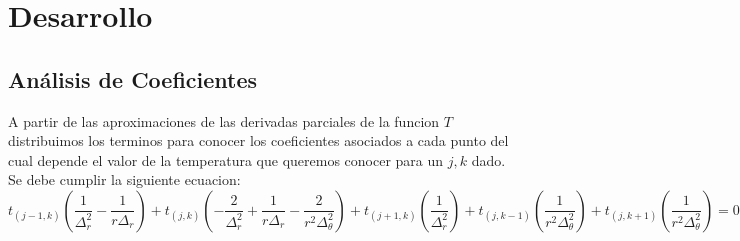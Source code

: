 \section{Desarrollo}

\subsection{Análisis de Coeficientes}
A partir de las aproximaciones de las derivadas parciales de la funcion $T$ distribuimos los terminos para conocer los coeficientes asociados a cada punto del cual depende el valor de la temperatura que queremos conocer para un $j,k$ dado. Se debe cumplir la siguiente ecuacion: \\
$$t_{(j-1, k)} (\frac{1}{\Delta^2_r}-\frac{1}{r \Delta_r}) +
t_{(j, k)} (-\frac{2}{\Delta^2_r}+\frac{1}{r \Delta_r}-\frac{2}{r^2 \Delta^2_\theta}) + 
t_{(j+1, k)} (\frac{1}{\Delta^2_r}) + 
t_{(j, k-1)} (\frac{1}{r^2 \Delta^2_\theta}) +
t_{(j, k+1)} (\frac{1}{r^2 \Delta^2_\theta}) = 0 $$ \\

